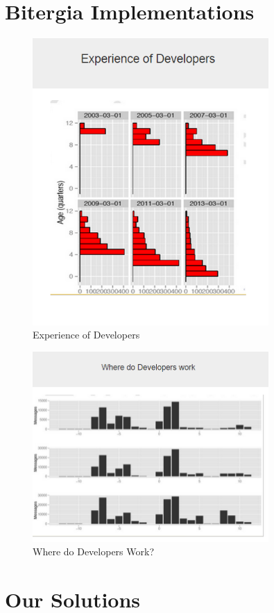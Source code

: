 \documentclass[double,12pt]{beavtex}
\begin{document}
\section{Bitergia Implementations}

\begin{figure}[!ht]
\centering
\includegraphics[width=90mm]{image11.PNG}
\caption{Experience of Developers}
\end{figure}

\begin{figure}[!ht]
\centering
\includegraphics[width=90mm]{image12.PNG}
\caption{Where do Developers Work?}
\end{figure}


\section{Our Solutions}
\end{document}
